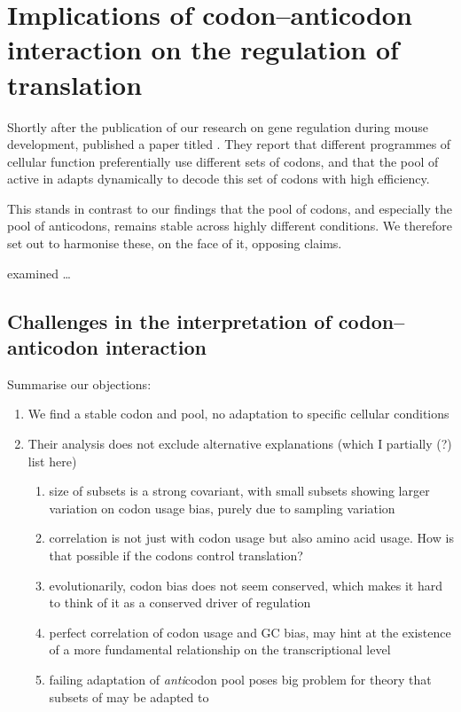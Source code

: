 \chapter{Implications of codon–anticodon interaction on the regulation of translation}

Shortly after the publication of our research on \trna gene regulation during
mouse development, \citet{Gingold:2014} published a paper titled . They report that different programmes of cellular function
preferentially use different sets of codons, and that the pool of active
\trna[s] in adapts dynamically to decode this set of codons with high
efficiency.

This stands in contrast to our findings that the pool of codons, and especially
the pool of anticodons, remains stable across highly different conditions. We
therefore set out to harmonise these, on the face of it, opposing claims.

\citet{Gingold:2014} examined …


\section{Challenges in the interpretation of codon–anticodon interaction}

Summarise our objections:

\begin{enumerate}
    \item We find a stable codon and \trna pool, no adaptation to specific cellular
conditions

    \item Their analysis does not exclude alternative explanations (which I partially
(?) list here)

        \begin{enumerate}
            \item size of \mrna subsets is a strong covariant, with small subsets
                showing larger variation on codon usage bias, purely due to
                sampling variation
            \item correlation is not just with codon usage but also amino acid
                usage. How is that possible if the codons control translation?
            \item evolutionarily, codon bias does not seem conserved, which
                makes it hard to think of it as a conserved driver of regulation
            \item perfect correlation of codon usage and GC bias, may hint at
                the existence of a more fundamental relationship on the
                transcriptional level
            \item failing adaptation of \emph{anti}codon pool poses big problem
                for theory that subsets of \mrna may be adapted to
        \end{enumerate}
\end{enumerate}

